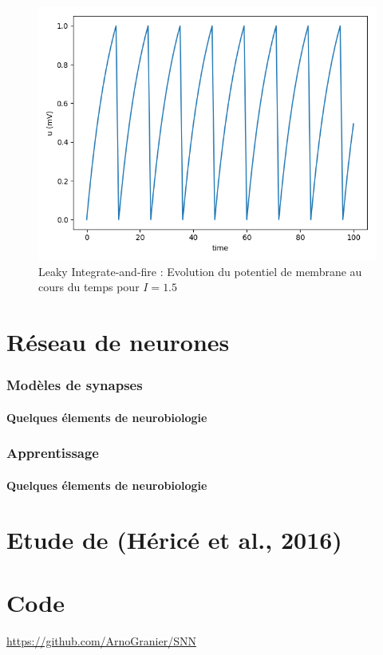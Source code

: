 \documentclass[12pt]{scrartcl}
\begin{document}
\begin{figure}[!h]
\centering
\includegraphics[scale=0.5]{imgs/liaf.png}
\caption{Leaky Integrate-and-fire : Evolution du potentiel de membrane au cours du temps pour $I = 1.5$}
\label{liaf}
\end{figure}

\pagebreak

\part{Réseau de neurones}

\section{Modèles de synapses}
\subsection{Quelques élements de neurobiologie}
\section{Apprentissage}
\subsection{Quelques élements de neurobiologie}
\part{Etude de (Héricé et al., 2016) }

\part{Code}
\url{https://github.com/ArnoGranier/SNN}

\nocite{*}



\end{document}
